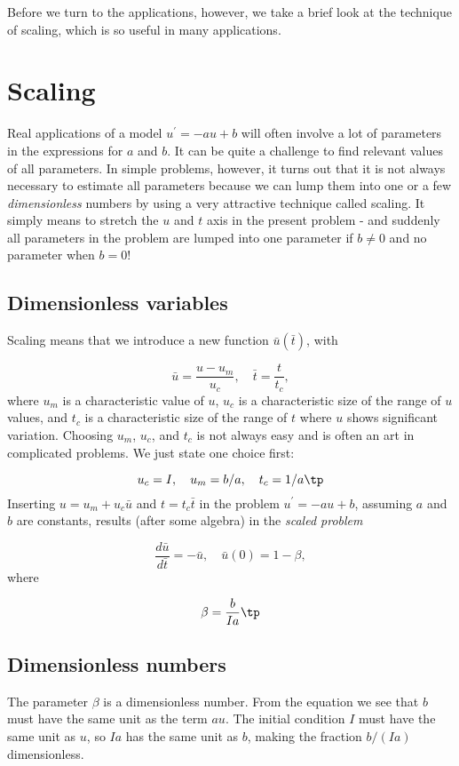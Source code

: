 \documentclass[graybox,sectrefs,envcountresetchap,open=right,final]{svmonodo}
\begin{document}
Before we turn to the applications, however, we take a brief look at
the technique of scaling, which is so useful in many applications.


\section{Scaling}
\label{decay:app:scaling}

Real applications of a model $u^{\prime}=-au+b$ will often involve a lot
of parameters in the expressions for $a$ and $b$. It can be quite
a challenge to find relevant values of all parameters. In simple
problems, however, it turns out that it is not always necessary
to estimate all parameters because we can lump them into one or
a few \emph{dimensionless} numbers by using a very attractive technique
called scaling. It simply means to stretch the $u$ and $t$ axis
in the present problem - and suddenly all parameters in the problem
are lumped into one parameter if $b\neq 0$ and no parameter when $b=0$!

\subsection{Dimensionless variables}

Scaling means that we introduce a new function $\bar u(\bar t)$,
with

\[ \bar u = \frac{u - u_m}{u_c},\quad \bar t = \frac{t}{t_c},\]
where $u_m$ is a characteristic value of $u$, $u_c$ is a characteristic
size of the range of $u$ values, and $t_c$ is a characteristic
size of the range of $t$ where $u$ shows significant variation.
Choosing $u_m$, $u_c$, and $t_c$ is not always easy and is often an art
in complicated problems. We just state one choice first:

\[ u_c = I,\quad u_m = b/a,\quad t_c = 1/a\tp\]
Inserting $u=u_m + u_c\bar u$ and $t=t_c\bar t$ in the problem
$u^{\prime}=-au + b$, assuming $a$ and $b$ are constants, results (after some
algebra) in the \emph{scaled problem}

\[ \frac{d\bar u}{d\bar t} = -\bar u,\quad \bar u(0)=1 - \beta,\]
where

\[ \beta = \frac{b}{Ia}\tp\]

\subsection{Dimensionless numbers}

The parameter $\beta$ is a dimensionless number. From the equation we
see that $b$ must have the same unit as the term $au$. The initial
condition $I$ must have the same unit as $u$, so $Ia$ has the same
unit as $b$, making the fraction $b/(Ia)$ dimensionless.
\end{document}
